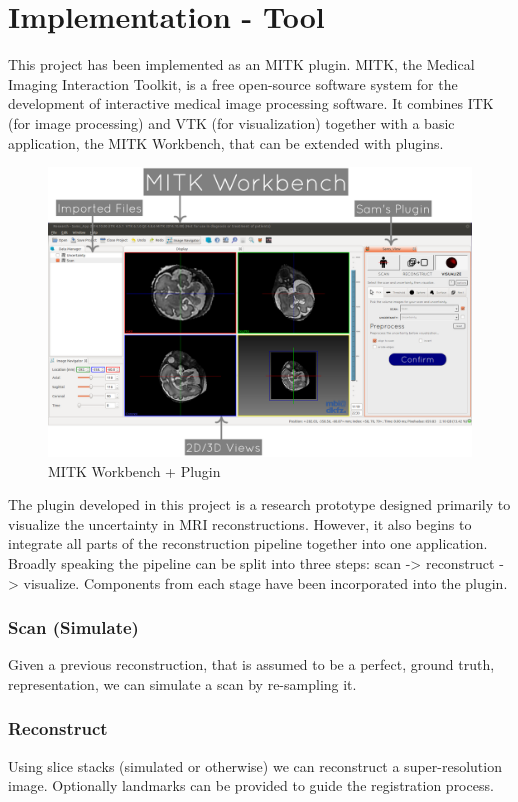 \chapter{Implementation - Tool}
This project has been implemented as an MITK plugin. MITK, the Medical Imaging Interaction Toolkit, is a free open-source software system for the development of interactive medical image processing software. It combines ITK (for image processing) and VTK (for visualization) together with a basic application, the MITK Workbench, that can be extended with plugins.

\begin{figure}[H]
  \includegraphics[width=\textwidth]{images/tool/mitk.png}
  \caption{MITK Workbench + Plugin}\label{fig:mitkoverview}
\end{figure}

The plugin developed in this project is a research prototype designed primarily to visualize the uncertainty in MRI reconstructions. However, it also begins to integrate all parts of the reconstruction pipeline together into one application. Broadly speaking the pipeline can be split into three steps: scan -> reconstruct -> visualize. Components from each stage have been incorporated into the plugin.

\subsection*{Scan (Simulate)}
Given a previous reconstruction, that is assumed to be a perfect, ground truth, representation, we can simulate a scan by re-sampling it.

\subsection*{Reconstruct}
Using slice stacks (simulated or otherwise) we can reconstruct a super-resolution image. Optionally landmarks can be provided to guide the registration process.

